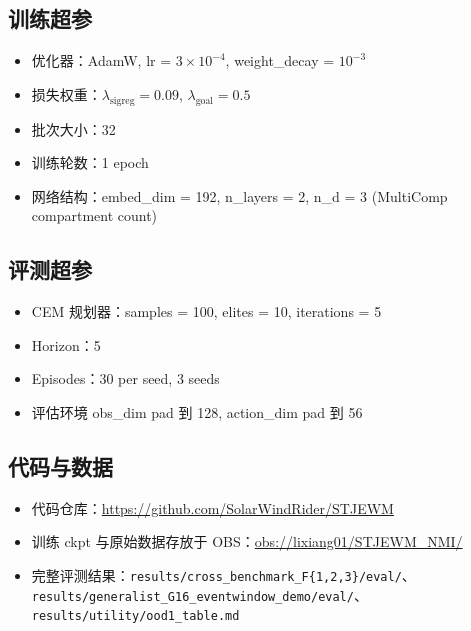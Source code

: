 \documentclass[11pt,a4paper]{article}
\begin{document}
\subsection{训练超参}
\begin{itemize}
    \item 优化器：AdamW, lr = $3 \times 10^{-4}$, weight\_decay = $10^{-3}$
    \item 损失权重：$\lambda_{\text{sigreg}} = 0.09$, $\lambda_{\text{goal}} = 0.5$
    \item 批次大小：32
    \item 训练轮数：1 epoch
    \item 网络结构：embed\_dim = 192, n\_layers = 2, n\_d = 3 (MultiComp compartment count)
\end{itemize}

\subsection{评测超参}
\begin{itemize}
    \item CEM 规划器：samples = 100, elites = 10, iterations = 5
    \item Horizon：5
    \item Episodes：30 per seed, 3 seeds
    \item 评估环境 obs\_dim pad 到 128, action\_dim pad 到 56
\end{itemize}

\subsection{代码与数据}
\begin{itemize}
    \item 代码仓库：\url{https://github.com/SolarWindRider/STJEWM}
    \item 训练 ckpt 与原始数据存放于 OBS：\url{obs://lixiang01/STJEWM_NMI/}
    \item 完整评测结果：\texttt{results/cross\_benchmark\_F\{1,2,3\}/eval/}、
    \texttt{results/generalist\_G16\_eventwindow\_demo/eval/}、
    \texttt{results/utility/ood1\_table.md}
\end{itemize}
\end{document}
